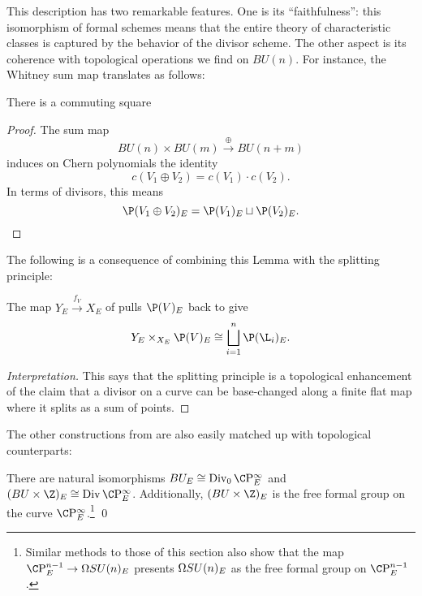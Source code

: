 This description has two remarkable features.  One is its ``faithfulness'': this isomorphism of formal schemes means that the entire theory of characteristic classes is captured by the behavior of the divisor scheme.  The other aspect is its coherence with topological operations we find on \(BU(n)\).  For instance, the Whitney sum map translates as follows:

\begin{lemma}\label{WhitneySumOfDivisors}
There is a commuting square
\begin{center}
\end{center}
\end{lemma}
\begin{proof}
The sum map \[BU(n) \times BU(m) \xrightarrow\oplus BU(n+m)\] induces on Chern polynomials the identity~\cite[Theorem 16.2.d]{Switzer} \[c(V_1 \oplus V_2) = c(V_1) \cdot c(V_2).\]  In terms of divisors, this means \[\P(V_1 \oplus V_2)_E = \P(V_1)_E \sqcup \P(V_2)_E. \qedhere\]
\end{proof}

The following is a consequence of combining this Lemma with the splitting principle:

\begin{corollary}
The map \(Y_E \xrightarrow{f_V} X_E\) of  pulls \(\P(V)_E\) back to give \[Y_E \times_{X_E} \P(V)_E \cong \bigsqcup_{i=1}^n \P(\L_i)_E.\]
\end{corollary}
\begin{proof}[Interpretation]
This says that the splitting principle is a topological enhancement of the claim that a divisor on a curve can be base-changed along a finite flat map where it splits as a sum of points.
\end{proof}

The other constructions from  are also easily matched up with topological counterparts:

\begin{corollary}\label{ECohomBUIsFree}
There are natural isomorphisms \(BU_E \cong \Div_0 \CP^\infty_E\) and \((BU \times \Z)_E \cong \Div \CP^\infty_E\). Additionally, \((BU \times \Z)_E\) is the free formal group on the curve \(\CP^\infty_E\).\footnote{Similar methods to those of this section also show that the map \(\CP^{n-1}_E \to \Loops SU(n)_E\) presents \(\Omega SU(n)_E\) as the free formal group on \(\CP^{n-1}_E\).} \qed
\end{corollary}

